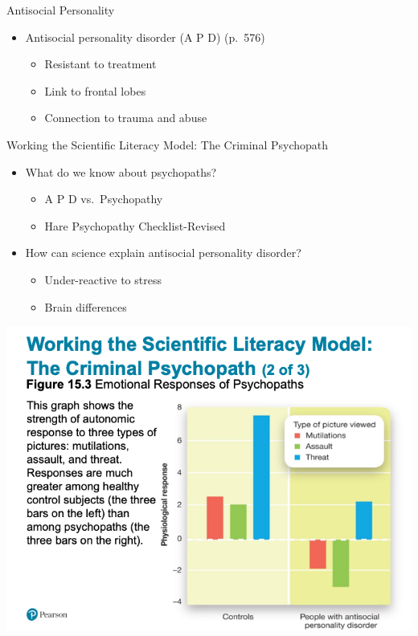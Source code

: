 \documentclass[
]{book}
\providecommand{\tightlist}{%
  \setlength{\itemsep}{0pt}\setlength{\parskip}{0pt}}
\begin{document}
\begin{reflect}
Antisocial Personality

\begin{itemize}
\tightlist
\item
  Antisocial personality disorder (A P D) (p.~576)

  \begin{itemize}
  \tightlist
  \item
    Resistant to treatment\\
  \item
    Link to frontal lobes\\
  \item
    Connection to trauma and abuse
  \end{itemize}
\end{itemize}

Working the Scientific Literacy Model: The Criminal Psychopath

\begin{itemize}
\tightlist
\item
  What do we know about psychopaths?

  \begin{itemize}
  \tightlist
  \item
    A P D vs.~Psychopathy\\
  \item
    Hare Psychopathy Checklist-Revised\\
  \end{itemize}
\item
  How can science explain antisocial personality disorder?

  \begin{itemize}
  \tightlist
  \item
    Under-reactive to stress\\
  \item
    Brain differences
  \end{itemize}
\end{itemize}

\includegraphics{assets/unit_10/slide_32.png}


\end{reflect}
\end{document}
